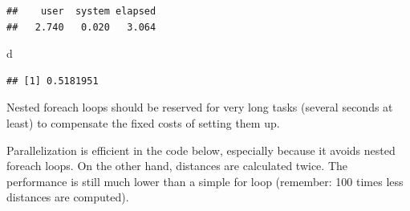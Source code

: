 \documentclass[
  12pt,
  american,
  a4paper,
  extrafontsizes,onecolumn,openright
  ]{memoir}
\newenvironment{Shaded}{\begin{snugshade}}{\end{snugshade}}
\newcommand{\AttributeTok}[1]{\textcolor[rgb]{0.77,0.63,0.00}{#1}}
\newcommand{\ControlFlowTok}[1]{\textcolor[rgb]{0.13,0.29,0.53}{\textbf{#1}}}
\newcommand{\DecValTok}[1]{\textcolor[rgb]{0.00,0.00,0.81}{#1}}
\newcommand{\FunctionTok}[1]{\textcolor[rgb]{0.00,0.00,0.00}{#1}}
\newcommand{\NormalTok}[1]{#1}
\newcommand{\OtherTok}[1]{\textcolor[rgb]{0.56,0.35,0.01}{#1}}
\newcommand{\SpecialCharTok}[1]{\textcolor[rgb]{0.00,0.00,0.00}{#1}}
\newcommand{\StringTok}[1]{\textcolor[rgb]{0.31,0.60,0.02}{#1}}
\newlength{\rf}
\begin{document}
\begin{verbatim}
##    user  system elapsed 
##   2.740   0.020   3.064
\end{verbatim}

\begin{Shaded}
\begin{Highlighting}[]
\NormalTok{d}
\end{Highlighting}
\end{Shaded}

\begin{verbatim}
## [1] 0.5181951
\end{verbatim}

\normalsize

Nested foreach loops should be reserved for very long tasks (several seconds at least) to compensate the fixed costs of setting them up.

Parallelization is efficient in the code below, especially because it avoids nested foreach loops.
On the other hand, distances are calculated twice.
The performance is still much lower than a simple for loop (remember: 100 times less distances are computed).

\scriptsize

\begin{Shaded}
\end{Shaded}
\end{document}
